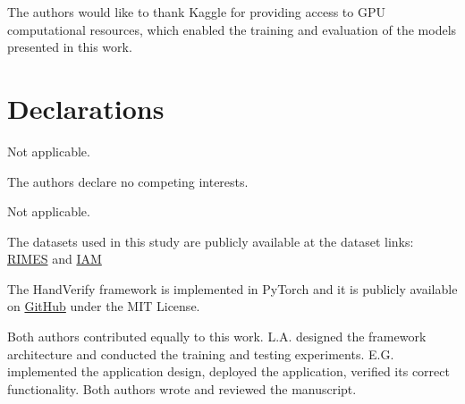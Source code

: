 \documentclass[pdflatex,sn-mathphys-num]{sn-jnl}
\theoremstyle{thmstyleone}%
\theoremstyle{thmstyletwo}%
\theoremstyle{thmstylethree}%
\begin{document}
%
%
%

%
%

\backmatter


The authors would like to thank Kaggle for providing access to GPU computational resources, which enabled the training and evaluation of the models presented in this work.

\section*{Declarations}

Not applicable.

The authors declare no competing interests.

Not applicable.

The datasets used in this study are publicly available at the dataset links: \href{https://www.kaggle.com/datasets/chaimaourgani/handwritten2text-training-dataset}{RIMES} and \href{https://www.kaggle.com/datasets/naderabdelghany/iam-handwritten-forms-dataset}{IAM}

The HandVerify framework is implemented in PyTorch and it is publicly available on \href{https://github.com/lorenzo-arcioni/HandVerify}{GitHub} under the MIT License.

Both authors contributed equally to this work. L.A. designed the framework architecture and conducted the training and testing experiments. E.G. implemented the application design, deployed the application, verified its correct functionality. Both authors wrote and reviewed the manuscript.



\newpage


\end{document}
